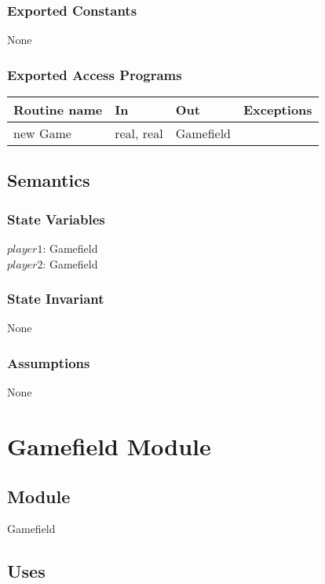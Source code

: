 \documentclass[12pt,fleqn]{article}
\begin{document}
    \subsubsection* {Exported Constants}
    None

    \subsubsection* {Exported Access Programs}


    \begin{tabular}{| l | l | l | l |}
    \hline
    \textbf{Routine name} & \textbf{In} & \textbf{Out} & \textbf{Exceptions}\\
    \hline
    new Game & real, real & Gamefield & ~\\
    \hline

    \end{tabular}

    \subsection* {Semantics}

    \subsubsection* {State Variables}
    $player1$: Gamefield\\
    $player2$: Gamefield

    \subsubsection* {State Invariant}
    None

    \subsubsection* {Assumptions}
    None

\newpage

\section* {Gamefield Module}

    \subsection* {Module}

    Gamefield

    \subsection* {Uses}
\end{document}
